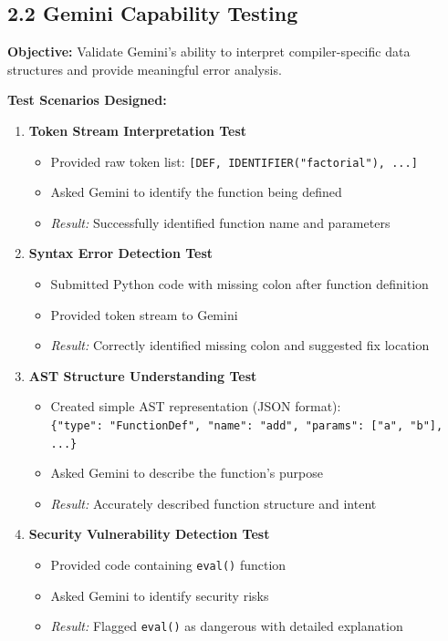 \documentclass[a4paper,11pt]{article}
\begin{document}
\subsection{2.2 Gemini Capability Testing}

\textbf{Objective:} Validate Gemini's ability to interpret compiler-specific data structures and provide meaningful error analysis.

\textbf{Test Scenarios Designed:}

\begin{enumerate}
    \item \textbf{Token Stream Interpretation Test}
    \begin{itemize}
        \item Provided raw token list: \texttt{[DEF, IDENTIFIER("factorial"), ...]}
        \item Asked Gemini to identify the function being defined
        \item \textit{Result:} Successfully identified function name and parameters
    \end{itemize}
    
    \item \textbf{Syntax Error Detection Test}
    \begin{itemize}
        \item Submitted Python code with missing colon after function definition
        \item Provided token stream to Gemini
        \item \textit{Result:} Correctly identified missing colon and suggested fix location
    \end{itemize}
    
    \item \textbf{AST Structure Understanding Test}
    \begin{itemize}
        \item Created simple AST representation (JSON format): \\
        \texttt{\{"type": "FunctionDef", "name": "add", "params": ["a", "b"], ...\}}
        \item Asked Gemini to describe the function's purpose
        \item \textit{Result:} Accurately described function structure and intent
    \end{itemize}
    
    \item \textbf{Security Vulnerability Detection Test}
    \begin{itemize}
        \item Provided code containing \texttt{eval()} function
        \item Asked Gemini to identify security risks
        \item \textit{Result:} Flagged \texttt{eval()} as dangerous with detailed explanation
    \end{itemize}
\end{enumerate}
\end{document}
